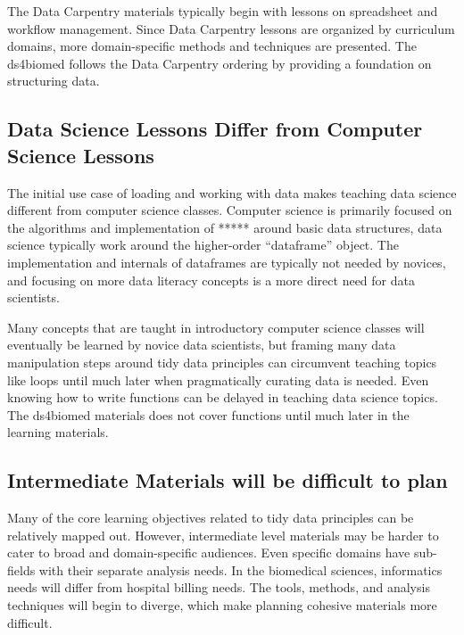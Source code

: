 \documentclass[030-workshop.tex]{subfiles}
\begin{document}
            The Data Carpentry materials typically begin with lessons on spreadsheet and workflow management.
            Since Data Carpentry lessons are organized by curriculum domains,
            more domain-specific methods and techniques are presented.
            The ds4biomed follows the Data Carpentry ordering by providing a foundation on structuring data.

    \subsection{Data Science Lessons Differ from Computer Science Lessons}

        The initial use case of loading and working with data makes teaching data science different from computer science classes.
        Computer science is primarily focused on the algorithms and implementation of ***** around basic data structures,
        data science typically work around the higher-order ``dataframe'' object.
        The implementation and internals of dataframes are typically not needed by novices,
        and focusing on more data literacy concepts is a more direct need for data scientists.

        Many concepts that are taught in introductory computer science classes will eventually be learned by novice data scientists,
        but framing many data manipulation steps around tidy data principles can circumvent
        teaching topics like loops until much later when pragmatically curating data is needed.
        Even knowing how to write functions can be delayed in teaching data science topics.
        The ds4biomed materials does not cover functions until much later in the learning materials.

    \subsection{Intermediate Materials will be difficult to plan}

        Many of the core learning objectives related to tidy data principles can be relatively mapped out.
        However, intermediate level materials may be harder to cater to broad and domain-specific audiences.
        Even specific domains have sub-fields with their separate analysis needs.
        In the biomedical sciences, informatics needs will differ from hospital billing needs.
        The tools, methods, and analysis techniques will begin to diverge, which make planning
        cohesive materials more difficult.
\end{document}
